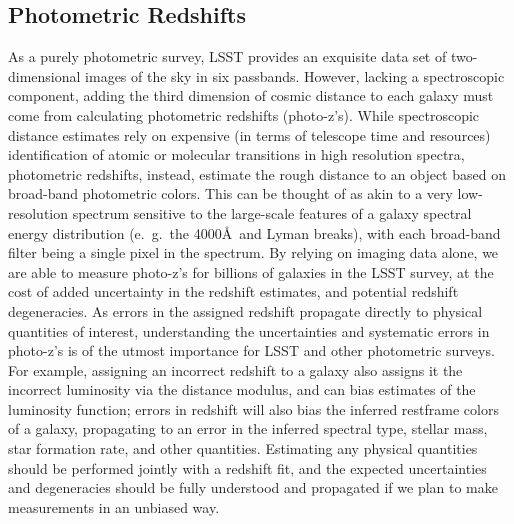 \subsection{Photometric Redshifts}
\label{sec:sci:gal:bkgnd:photoz}
As a purely photometric survey, LSST provides an exquisite data set of two-dimensional images of the sky in six passbands.  However, lacking a spectroscopic component, adding the third dimension of cosmic distance to each galaxy must come from calculating photometric redshifts (photo-z's).  While spectroscopic distance estimates rely on expensive (in terms of telescope time and resources) identification of atomic or molecular transitions in high resolution spectra, photometric redshifts, instead, estimate the rough distance to an object based on broad-band photometric colors.  This can be thought of as akin to a very low-resolution spectrum sensitive to the large-scale features of a galaxy spectral energy distribution (e.~g.~the 4000\AA\  and Lyman breaks), with each broad-band filter being a single pixel in the spectrum.  By relying on imaging data alone, we are able to measure photo-z's for billions of galaxies in the LSST survey, at the cost of added uncertainty in the redshift estimates, and potential redshift degeneracies.  
   As errors in the assigned redshift propagate directly to physical quantities of interest, understanding the uncertainties and systematic errors in photo-z's is of the utmost importance for LSST and other photometric surveys.  For example, assigning an incorrect redshift to a galaxy also assigns it the incorrect luminosity via the distance modulus, and can bias estimates of the luminosity function; errors in redshift will also bias the inferred restframe colors of a galaxy, propagating to an error in the inferred spectral type, stellar mass, star formation rate, and other quantities.  Estimating any physical quantities should be performed jointly with a redshift fit, and the expected uncertainties and degeneracies should be fully understood and propagated if we plan to make measurements in an unbiased way.  
